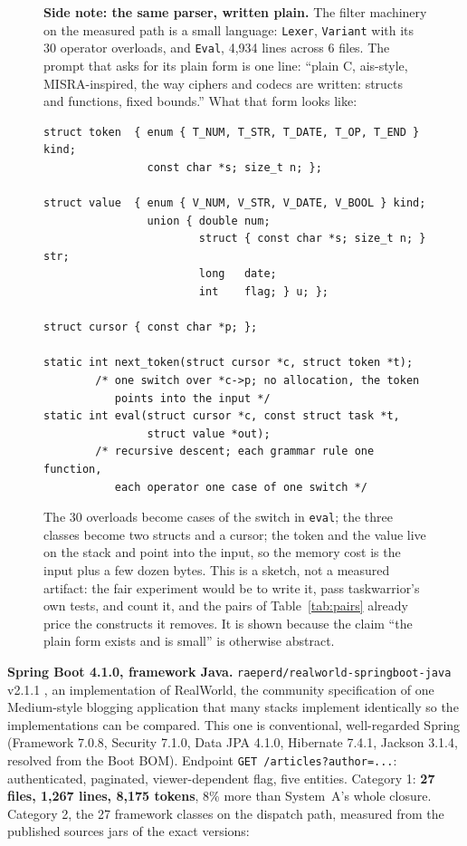 \documentclass[journal]{IEEEtran}
\begin{document}
\begin{figure}[!t]
\footnotesize
\textbf{Side note: the same parser, written plain.} The filter machinery on
the measured path is a small language: \texttt{Lexer}, \texttt{Variant}
with its 30 operator overloads, and \texttt{Eval}, 4,934 lines across 6
files. The prompt that asks for its plain form is one line: ``plain C,
ais-style, MISRA-inspired, the way ciphers and codecs are written: structs
and functions, fixed bounds.'' What that form looks like:

\begin{verbatim}
struct token  { enum { T_NUM, T_STR, T_DATE, T_OP, T_END } kind;
                const char *s; size_t n; };

struct value  { enum { V_NUM, V_STR, V_DATE, V_BOOL } kind;
                union { double num;
                        struct { const char *s; size_t n; } str;
                        long   date;
                        int    flag; } u; };

struct cursor { const char *p; };

static int next_token(struct cursor *c, struct token *t);
        /* one switch over *c->p; no allocation, the token
           points into the input */
static int eval(struct cursor *c, const struct task *t,
                struct value *out);
        /* recursive descent; each grammar rule one function,
           each operator one case of one switch */
\end{verbatim}

The 30 overloads become cases of the switch in \texttt{eval}; the three
classes become two structs and a cursor; the token and the value live on
the stack and point into the input, so the memory cost is the input plus a
few dozen bytes. This is a sketch, not a measured artifact: the fair
experiment would be to write it, pass taskwarrior's own tests, and count
it,
and the pairs of Table~\ref{tab:pairs} already price the constructs it
removes. It is shown because the claim ``the plain form exists and is
small'' is otherwise abstract.
\end{figure}

\textbf{Spring Boot 4.1.0, framework Java.} \texttt{raeperd/}\allowbreak\texttt{realworld-}\allowbreak\texttt{springboot-java}
v2.1.1 \cite{realworld}, an implementation of RealWorld, the community
specification of one Medium-style blogging application that many stacks
implement identically so the implementations can be compared. This one is
conventional, well-regarded Spring (Framework 7.0.8, Security 7.1.0, Data
JPA 4.1.0, Hibernate 7.4.1, Jackson 3.1.4, resolved from the Boot BOM). Endpoint
\texttt{GET /articles?author=...}: authenticated, paginated, viewer-dependent
flag, five entities. Category 1: \textbf{27 files, 1,267 lines, 8,175
tokens}, 8\% more than System~A's whole closure. Category 2, the 27 framework
classes on the dispatch path, measured from the published sources jars of the
exact versions:
\end{document}
